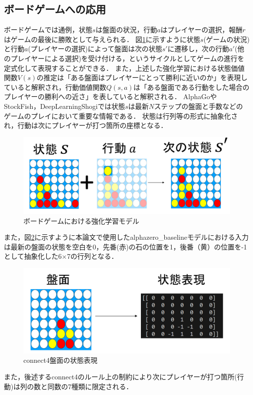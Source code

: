 \subsection{ボードゲームへの応用}
ボードゲームでは通例，状態$s$は盤面の状況，行動$a$はプレイヤーの選択，報酬$r$はゲームの最後に勝敗として与えられる．
図\ref{fig:board-game-model}に示すように状態$s$(ゲームの状況)と行動$a$(プレイヤーの選択)によって盤面は次の状態$s'$に遷移し，次の行動$a'$(他のプレイヤーによる選択)を受け付ける，というサイクルとしてゲームの進行を定式化して表現することができる．
また，上述した強化学習における状態価値関数$V(s)$の推定は「ある盤面はプレイヤーにとって勝利に近いのか」を表現していると解釈され，行動価値関数$Q(s, a)$は「ある盤面である行動をした場合のプレイヤーの勝利への近さ」を表していると解釈される．
AlphaGo\cite{AlphaGo}やStockFish\cite{StockFish}，DeepLearningShogi\cite{dlshogi}では状態$s$は最新$N$ステップの盤面と手数などのゲームのプレイにおいて重要な情報である．
状態は行列等の形式に抽象化され，行動は次にプレイヤーが打つ箇所の座標となる．
\begin{figure}[htbp]
	\includegraphics[width=\linewidth]{./figure/transition.png}
	\caption{ボードゲームにおける強化学習モデル}
	\label{fig:board-game-model}
\end{figure}

また，図\ref{fig:connect4-symbol}に示すように本論文で使用したalphazero\_baselineモデル\cite{baseline}における入力は最新の盤面の状態を空白を0，先番(赤)の石の位置を1，後番（黄）の位置を-1として抽象化した6$\times$7の行列となる．
\begin{figure}[htbp]
	\centering
	\includegraphics[width=\linewidth]{./figure/symbolic.png}
	\caption{connect4盤面の状態表現}
	\label{fig:connect4-symbol}
\end{figure}
また，後述するconnect4のルール上の制約により次にプレイヤーが打つ箇所(行動)は列の数と同数の7種類に限定される．

